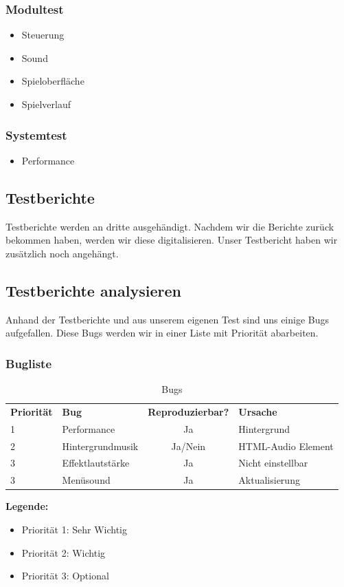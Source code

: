 \subsubsection{Modultest}
\begin{itemize}
	\item Steuerung
	\item Sound
	\item Spieloberfläche
	\item Spielverlauf
\end{itemize}
\subsubsection{Systemtest}
\begin{itemize}
	\item Performance
\end{itemize}
\subsection{Testberichte}
Testberichte werden an dritte ausgehändigt. Nachdem wir die Berichte zurück bekommen haben, werden wir diese digitalisieren. 
Unser Testbericht haben wir zusätzlich noch angehängt. 




\subsection{Testberichte analysieren}
Anhand der Testberichte und aus unserem eigenen Test sind uns einige Bugs aufgefallen. Diese Bugs werden wir in einer Liste mit Priorität abarbeiten.
\subsubsection{Bugliste}
\begin{table}[h]
	\centering
	\begin{tabular}{l|l|c|l}
		\textbf{Priorität}& \textbf{Bug} & \textbf{Reproduzierbar?} & \textbf{Ursache}\\
		1 & Performance & Ja & Hintergrund	\\ 
		2 & Hintergrundmusik & Ja/Nein & HTML-Audio Element\\
		3 & Effektlautstärke & Ja & Nicht einstellbar\\
		3 & Menüsound & Ja & Aktualisierung\\
	\end{tabular}
	\caption{Bugs}
\end{table}
\textbf{Legende:}
\begin{itemize}
	\item Priorität 1: Sehr Wichtig
	\item Priorität 2: Wichtig
	\item Priorität 3: Optional
\end{itemize}
